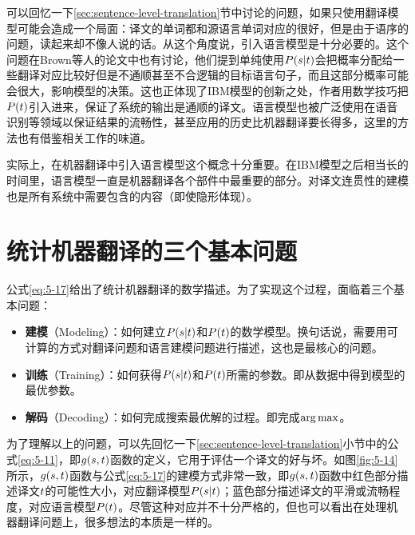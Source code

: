 \parinterval 可以回忆一下\ref{sec:sentence-level-translation}节中讨论的问题，如果只使用翻译模型可能会造成一个局面：译文的单词都和源语言单词对应的很好，但是由于语序的问题，读起来却不像人说的话。从这个角度说，引入语言模型是十分必要的。这个问题在Brown等人的论文中也有讨论，他们提到单纯使用${P}({s}|{t})$会把概率分配给一些翻译对应比较好但是不通顺甚至不合逻辑的目标语言句子，而且这部分概率可能会很大，影响模型的决策。这也正体现了IBM模型的创新之处，作者用数学技巧把${P}({t})$引入进来，保证了系统的输出是通顺的译文。语言模型也被广泛使用在语音识别等领域以保证结果的流畅性，甚至应用的历史比机器翻译要长得多，这里的方法也有借鉴相关工作的味道。

实际上，在机器翻译中引入语言模型这个概念十分重要。在IBM模型之后相当长的时间里，语言模型一直是机器翻译各个部件中最重要的部分。对译文连贯性的建模也是所有系统中需要包含的内容（即使隐形体现）。

\sectionnewpage
\section{统计机器翻译的三个基本问题}

\parinterval 公式\eqref{eq:5-17}给出了统计机器翻译的数学描述。为了实现这个过程，面临着三个基本问题：

\begin{itemize}
\vspace{0.5em}
\item {\small\sffamily\bfseries{建模}}（Modeling）：如何建立${P}({s}|{t})$和${P}({t})$的数学模型。换句话说，需要用可计算的方式对翻译问题和语言建模问题进行描述，这也是最核心的问题。
\vspace{0.5em}
\item {\small\sffamily\bfseries{训练}}（Training）：如何获得${P}({s}|{t})$和${P}({t})$所需的参数。即从数据中得到模型的最优参数。
\vspace{0.5em}
\item {\small\sffamily\bfseries{解码}}（Decoding）：如何完成搜索最优解的过程。即完成$\operatorname*{arg\,max}$。
\vspace{0.5em}
\end{itemize}

\parinterval 为了理解以上的问题，可以先回忆一下\ref{sec:sentence-level-translation}小节中的公式\eqref{eq:5-11}，即$g({s},{t})$函数的定义，它用于评估一个译文的好与坏。如图\ref{fig:5-14}所示，$g({s},{t})$函数与公式\eqref{eq:5-17}的建模方式非常一致，即$g({s},{t})$函数中红色部分描述译文${t}$的可能性大小，对应翻译模型${P}({s}|{t})$；蓝色部分描述译文的平滑或流畅程度，对应语言模型${P}({t})$。尽管这种对应并不十分严格的，但也可以看出在处理机器翻译问题上，很多想法的本质是一样的。

